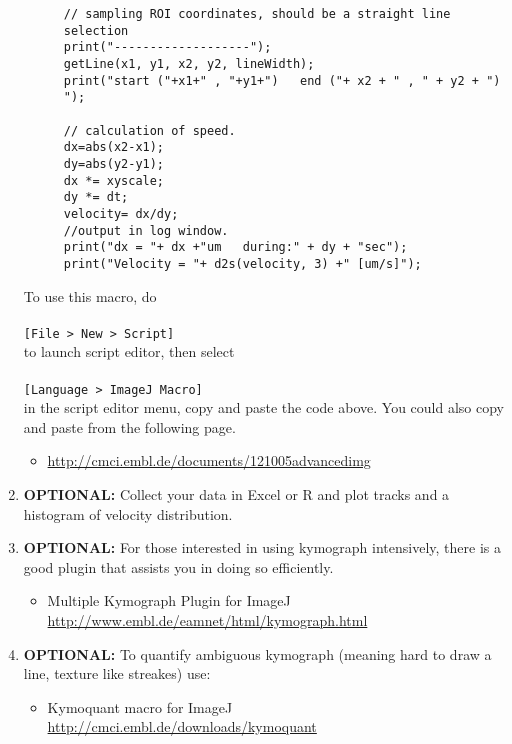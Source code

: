 \documentclass[11pnt]{article}
\begin{document}
\begin{enumerate}
\begin{description}
\begin{verbatim}
// sampling ROI coordinates, should be a straight line selection
print("-------------------");
getLine(x1, y1, x2, y2, lineWidth);
print("start ("+x1+" , "+y1+")   end ("+ x2 + " , " + y2 + ") ");

// calculation of speed. 
dx=abs(x2-x1);
dy=abs(y2-y1);
dx *= xyscale;
dy *= dt;
velocity= dx/dy;
//output in log window.
print("dx = "+ dx +"um   during:" + dy + "sec");
print("Velocity = "+ d2s(velocity, 3) +" [um/s]");
\end{verbatim}
\end{description}

To use this macro, do 
\\
\\
\verb"[File > New > Script]"
\\
to launch script editor, then select 
\\
\\
\verb"[Language > ImageJ Macro]" 
\\
in the script editor menu, copy and paste the code above. You could also copy and paste from the following page. 
\begin{itemize}
\item \url{http://cmci.embl.de/documents/121005advancedimg}
\end{itemize}

\item \textbf{OPTIONAL:} Collect your data in Excel or R and plot tracks and a histogram of velocity distribution.


\item \textbf{OPTIONAL:} For those interested in using kymograph intensively, there is a good plugin that assists you in doing so efficiently. 
\begin{itemize}
\item Multiple Kymograph Plugin for ImageJ\\  \url{http://www.embl.de/eamnet/html/kymograph.html}
\end{itemize}

\item \textbf{OPTIONAL:} To quantify ambiguous kymograph (meaning hard to draw a line, texture like streakes) use:
\begin{itemize}
\item Kymoquant macro for ImageJ\\ \url{http://cmci.embl.de/downloads/kymoquant}
\end{itemize}

\end{enumerate}
\end{document}
